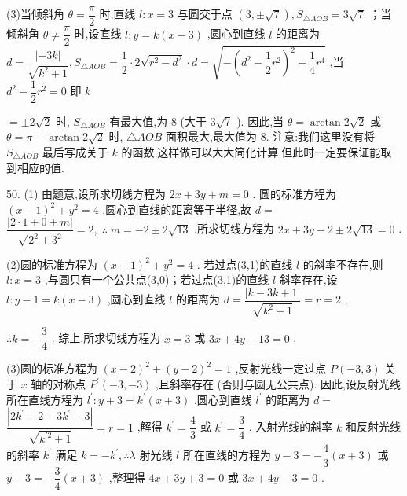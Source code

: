 (3)当倾斜角 $\theta  = \dfrac{\pi }{2}$ 时,直线 $l : x = 3$ 与圆交于点 $\left( {3, \pm  \sqrt{7}}\right) ,{S}_{\bigtriangleup {AOB}} = 3\sqrt{7}$ ；当倾斜角 $\theta  \neq  \dfrac{\pi }{2}$ 时,设直线 $l : y = k\left( {x - 3}\right)$ ,圆心到直线 $l$ 的距离为 $d = \dfrac{\left| -3k\right| }{\sqrt{{k}^{2} + 1}},{S}_{\bigtriangleup {AOB}} = \dfrac{1}{2} \cdot  2\sqrt{{r}^{2} - {d}^{2}} \cdot  d = \sqrt{-{\left( {d}^{2} - \dfrac{1}{2}{r}^{2}\right) }^{2} + \dfrac{1}{4}{r}^{4}}$ ,当 ${d}^{2} - \dfrac{1}{2}{r}^{2} = 0$ 即 $k$

$=  \pm  2\sqrt{2}$ 时, ${S}_{\bigtriangleup {AOB}}$ 有最大值,为 8 (大于 $3\sqrt{7}$ ). 因此,当 $\theta  = \arctan 2\sqrt{2}$ 或 $\theta  = \pi  - \arctan 2\sqrt{2}$ 时, $\bigtriangleup  {AOB}$ 面积最大,最大值为 8. 注意:我们这里没有将 ${S}_{\bigtriangleup {AOB}}$ 最后写成关于 $k$ 的函数,这样做可以大大简化计算,但此时一定要保证能取到相应的值.

50. (1) 由题意,设所求切线方程为 ${2x} + {3y} + m = 0$ . 圆的标准方程为 ${\left( x - 1\right) }^{2} + {y}^{2} = 4$ ,圆心到直线的距离等于半径,故 $d =$  $\dfrac{\left| 2 \cdot  1 + 0 + m\right| }{\sqrt{{2}^{2} + {3}^{2}}} = 2,\;\therefore \;m =  - 2 \pm  2\sqrt{13}$ ,所求切线方程为 ${2x} + {3y} - 2 \pm  2\sqrt{13} = 0$ .

(2)圆的标准方程为 ${\left( x - 1\right) }^{2} + {y}^{2} = 4$ . 若过点(3,1)的直线 $l$ 的斜率不存在,则 $l : x = 3$ ,与圆只有一个公共点(3,0)；若过点(3,1)的直线 $l$ 斜率存在,设 $l : y - 1 = k\left( {x - 3}\right)$ ,圆心到直线 $l$ 的距离为 $d = \dfrac{\left| k - 3k + 1\right| }{\sqrt{{k}^{2} + 1}} = r = 2$ ,

$\therefore k =  - \dfrac{3}{4}$ . 综上,所求切线方程为 $x = 3$ 或 ${3x} + {4y} - {13} = 0$ .

(3)圆的标准方程为 ${\left( x - 2\right) }^{2} + {\left( y - 2\right) }^{2} = 1$ ,反射光线一定过点 $P\left( {-3,3}\right)$ 关于 $x$ 轴的对称点 ${P}^{\prime }\left( {-3, - 3}\right)$ ,且斜率存在 (否则与圆无公共点). 因此,设反射光线所在直线方程为 ${l}^{\prime } : y + 3 = {k}^{\prime }\left( {x + 3}\right)$ ,圆心到直线 ${l}^{\prime }$ 的距离为 $d =$  $\dfrac{\left| 2{k}^{\prime } - 2 + 3{k}^{\prime } - 3\right| }{\sqrt{{k}^{\prime 2} + 1}} = r = 1$ ,解得 ${k}^{\prime } = \dfrac{4}{3}$ 或 ${k}^{\prime } = \dfrac{3}{4}$ . 入射光线的斜率 $k$ 和反射光线的斜率 ${k}^{\prime }$ 满足 $k =  - {k}^{\prime },\therefore \lambda$ 射光线 $l$ 所在直线的方程为 $y - 3 =  - \dfrac{4}{3}\left( {x + 3}\right)$ 或 $y - 3 =  - \dfrac{3}{4}\left( {x + 3}\right)$ ,整理得 ${4x} + {3y} + 3 = 0$ 或 ${3x} + {4y} - 3 = 0$ .

